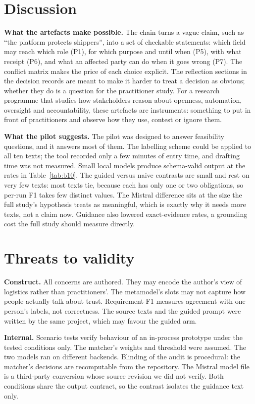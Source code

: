 \documentclass[10pt,twocolumn]{article}
\begin{document}
\section{Discussion}
\textbf{What the artefacts make possible.} The chain turns a vague claim, such as ``the platform protects shippers'', into a set of checkable statements: which field may reach which role (P1), for which purpose and until when (P5), with what receipt (P6), and what an affected party can do when it goes wrong (P7). The conflict matrix makes the price of each choice explicit. The reflection sections in the decision records are meant to make it harder to treat a decision as obvious; whether they do is a question for the practitioner study. For a research programme that studies how stakeholders reason about openness, automation, oversight and accountability, these artefacts are instruments: something to put in front of practitioners and observe how they use, contest or ignore them.

\textbf{What the pilot suggests.} The pilot was designed to answer feasibility questions, and it answers most of them. The labelling scheme could be applied to all ten texts; the tool recorded only a few minutes of entry time, and drafting time was not measured. Small local models produce schema-valid output at the rates in Table~\ref{tab:b10}. The guided versus naive contrasts are small and rest on very few texts: most texts tie, because each has only one or two obligations, so per-run F1 takes few distinct values. The Mistral difference sits at the size the full study's hypothesis treats as meaningful, which is exactly why it needs more texts, not a claim now. Guidance also lowered exact-evidence rates, a grounding cost the full study should measure directly.

\section{Threats to validity}
\textbf{Construct.} All concerns are authored. They may encode the author's view of logistics rather than practitioners'. The metamodel's slots may not capture how people actually talk about trust. Requirement F1 measures agreement with one person's labels, not correctness. The source texts and the guided prompt were written by the same project, which may favour the guided arm.

\textbf{Internal.} Scenario tests verify behaviour of an in-process prototype under the tested conditions only. The matcher's weights and threshold were assumed. The two models ran on different backends.  Blinding of the audit is procedural: the matcher's decisions are recomputable from the repository. The Mistral model file is a third-party conversion whose source revision we did not verify. Both conditions share the output contract, so the contrast isolates the guidance text only.
\end{document}

